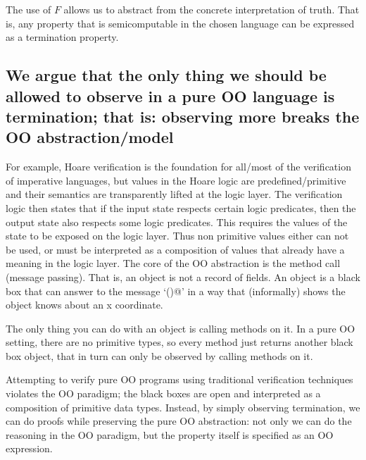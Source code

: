 \documentclass[runningheads]{llncs}
\begin{document}
The use of $F$ allows us to abstract from the concrete interpretation of truth.
That is, any property that is semicomputable in the chosen language can be expressed as a termination property.


\subsection{We argue that the only thing we should be allowed to observe in a pure OO language is termination; that is: observing more breaks the OO abstraction/model}

For example, Hoare verification is the foundation for all/most of the verification of imperative languages, but values in the Hoare logic are predefined/primitive and their semantics are transparently lifted at the logic layer.
The verification logic then states that if the input state respects certain logic predicates, then the output state also respects some logic predicates.
This requires the values of the state to be exposed on the logic layer. Thus non primitive values either can not be used, or must be interpreted as a composition of values that already have a meaning in the logic layer.
The core of the OO abstraction is the method call (message passing).
That is, an object is not a record of fields. An object is a black box that can answer to the message `\Q@getX()@' in a way that (informally) shows the object knows about an x coordinate.

The only thing you can do with an object is calling methods on it.
In a pure OO setting, there are no primitive types, so every method just returns another black box object, that in turn can only be observed by calling methods on it.

Attempting to verify pure OO programs using traditional verification techniques violates the OO paradigm; the black boxes are open and interpreted as a composition of primitive data types. Instead, by simply observing termination, we can do proofs while preserving the pure OO abstraction: not only we can do the reasoning in the OO paradigm, but the property itself is specified as an OO expression.

\end{document}
